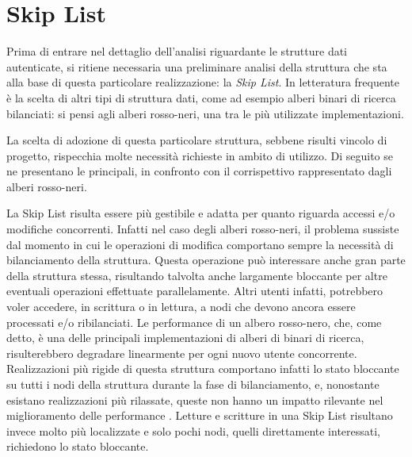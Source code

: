 	
\section{Skip List}



	Prima di entrare nel dettaglio dell'analisi riguardante le strutture dati autenticate, si ritiene necessaria una preliminare analisi della struttura che sta alla base di questa particolare realizzazione: la \textit{Skip List}. In letteratura frequente è la scelta di altri tipi di struttura dati, come ad esempio alberi binari di ricerca bilanciati: si pensi agli alberi rosso-neri, una tra le più utilizzate implementazioni.
	
	La scelta di adozione di questa particolare struttura, sebbene risulti vincolo di progetto, rispecchia molte necessità richieste in ambito di utilizzo. Di seguito se ne presentano le principali, in confronto con il corrispettivo rappresentato dagli alberi rosso-neri.
	
	La Skip List risulta essere più gestibile e adatta per quanto riguarda accessi e/o modifiche concorrenti. Infatti nel caso degli alberi rosso-neri, il problema sussiste dal momento in cui le operazioni di modifica comportano sempre la necessità di bilanciamento della struttura. Questa operazione può interessare anche gran parte della struttura stessa, risultando talvolta anche largamente bloccante per altre eventuali operazioni effettuate parallelamente. Altri utenti infatti, potrebbero voler accedere, in scrittura o in lettura, a nodi che devono ancora essere processati e/o ribilanciati. Le performance di un albero rosso-nero, che, come detto, è una delle principali implementazioni di alberi di binari di ricerca, risulterebbero degradare linearmente per ogni nuovo utente concorrente. Realizzazioni più rigide di questa struttura comportano infatti lo stato bloccante su tutti i nodi della struttura durante la fase di bilanciamento, e, nonostante esistano realizzazioni più rilassate, queste non hanno un impatto rilevante nel miglioramento delle performance \cite{blocking_datastructures}.
	Letture e scritture in una Skip List risultano invece molto più localizzate e solo pochi nodi, quelli direttamente interessati, richiedono lo stato bloccante.
	
